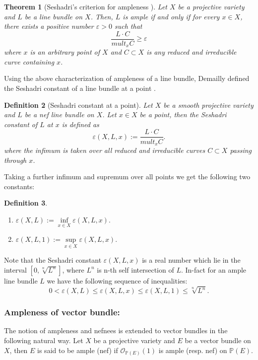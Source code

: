 \documentclass[11pt,reqno,a4paper]{amsart}
\newtheorem{theorem}{Theorem}[section]
\newtheorem{definition}[theorem]{Definition}
\theoremstyle{remark}
\begin{document}
\begin{theorem}[Seshadri's criterion for ampleness \cite{Har1}]
Let $X$ be a projective variety and $L$ be a line bundle on $X$. Then, $L$ is ample if and only if for every $x \in X$, there exists a positive number $\varepsilon > 0$ such that
\[
\frac{L\cdot C}{mult_x C} \geq \varepsilon
\]
where $x$ is an arbitrary point of $X$ and $C\subset X$ is any reduced and irreducible curve containing $x$.
\end{theorem}

Using the above characterization of ampleness of a line bundle, Demailly defined the Seshadri constant of a line bundle 
at a point \cite{Dem}.
\begin{definition}[Seshadri constant at a point]
Let $X$ be a smooth projective variety and $L$ be a nef line bundle on $X$. Let $x \in X$ be a point, then the Seshadri constant of $L$ at $x$ is defined as
\[
\varepsilon(X, L, x) := \frac{L\cdot C}{mult_x C}.
\]
where the infimum is taken over all reduced and irreducible curves $C \subset X$ passing through $x$.
\end{definition}
Taking a further infimum and supremum over all points we get the following two constants:
\begin{definition}
\begin{enumerate}
\item[(a)] $\varepsilon(X, L) := \inf\limits_{x \in X} \varepsilon(X, L, x).$
\item[(b)]  $\varepsilon(X, L, 1) := \sup\limits_{x \in X} \varepsilon(X, L, x).$
\end{enumerate}
\end{definition}
Note that the Seshadri constant $\varepsilon(X, L, x)$ is a real number which lie in the interval $[0, \sqrt[n]{L^n}]$, 
where $L^n$ is n-th self intersection of $L$. In-fact for an ample line bundle $L$ we have the following sequence of inequalities:
\[
0 < \varepsilon(X, L) \leq \varepsilon(X, L, x) \leq \varepsilon(X, L,1) \leq \sqrt[n]{L^n}.
\]

\subsubsection*{Ampleness of vector bundle:}
The notion of ampleness and nefnees is extended to vector bundles in the following natural way. Let $X$ be a projective 
variety and $E$ be a vector bundle on $X$, then $E$ is said to be ample (nef) if $\mathcal{O}_{\mathbb{P}(E)}(1)$ is ample (resp. nef) on $\mathbb{P}(E)$.
\end{document}

